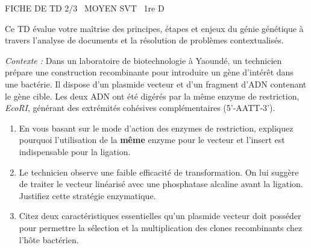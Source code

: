 \documentclass[11pt]{article}
\begin{document}
\begin{tcolorbox}[enhanced,colback=popink,colframe=popink,arc=10pt,boxrule=0pt,left=12pt,right=12pt,top=9pt,bottom=9pt]
{\color{white}\popxbold\small FICHE DE TD 2/3 \textbullet\ MOYEN \hfill SVT \textbullet\ 1re D\par}
\end{tcolorbox}
\vspace{4pt}
Ce TD évalue votre maîtrise des principes, étapes et enjeux du génie génétique à travers l'analyse de documents et la résolution de problèmes contextualisés.

\begin{exercice}
\emph{Contexte :} Dans un laboratoire de biotechnologie à Yaoundé, un technicien prépare une construction recombinante pour introduire un gène d'intérêt dans une bactérie. Il dispose d'un plasmide vecteur et d'un fragment d'ADN contenant le gène cible. Les deux ADN ont été digérés par la même enzyme de restriction, \textit{EcoRI}, générant des extrémités cohésives complémentaires (5'-AATT-3').

\begin{enumerate}
    \item En vous basant sur le mode d'action des enzymes de restriction, expliquez pourquoi l'utilisation de la \textbf{même} enzyme pour le vecteur et l'insert est indispensable pour la ligation.
    \item Le technicien observe une faible efficacité de transformation. On lui suggère de traiter le vecteur linéarisé avec une phosphatase alcaline avant la ligation. Justifiez cette stratégie enzymatique.
    \item Citez deux caractéristiques essentielles qu'un plasmide vecteur doit posséder pour permettre la sélection et la multiplication des clones recombinants chez l'hôte bactérien.
\end{enumerate}
\end{exercice}
\end{document}
